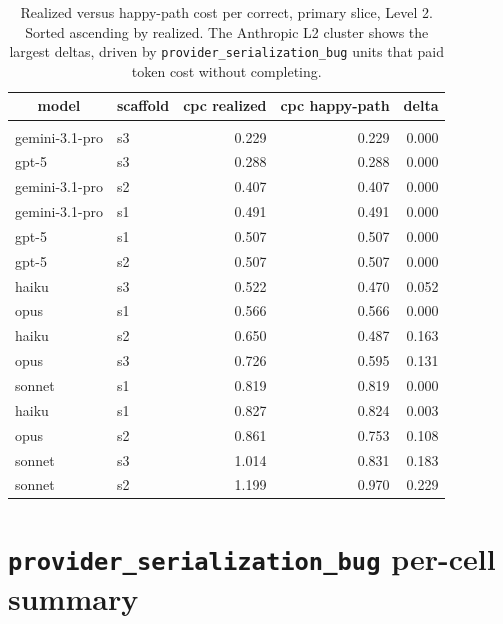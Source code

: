 \documentclass[10pt]{article} %
\begin{document}
    \begin{table}[t]
        \caption{Realized versus happy-path cost per correct, primary slice, Level 2. Sorted ascending by realized. The Anthropic L2 cluster shows the largest deltas, driven by \texttt{provider\_serialization\_bug} units that paid token cost without completing.}
    \label{tab:cpc_happy_L2}
    \begin{center}
    \small
    \begin{tabular}{llrrr}
        \multicolumn{1}{c}{\bf model} & \multicolumn{1}{c}{\bf scaffold} & \multicolumn{1}{c}{\bf cpc realized} & \multicolumn{1}{c}{\bf cpc happy-path} & \multicolumn{1}{c}{\bf delta} \\
        \hline \\
        gemini-3.1-pro & s3 & 0.229 & 0.229 & 0.000 \\
        gpt-5 & s3 & 0.288 & 0.288 & 0.000 \\
        gemini-3.1-pro & s2 & 0.407 & 0.407 & 0.000 \\
        gemini-3.1-pro & s1 & 0.491 & 0.491 & 0.000 \\
        gpt-5 & s1 & 0.507 & 0.507 & 0.000 \\
        gpt-5 & s2 & 0.507 & 0.507 & 0.000 \\
        haiku & s3 & 0.522 & 0.470 & 0.052 \\
        opus & s1 & 0.566 & 0.566 & 0.000 \\
        haiku & s2 & 0.650 & 0.487 & 0.163 \\
        opus & s3 & 0.726 & 0.595 & 0.131 \\
        sonnet & s1 & 0.819 & 0.819 & 0.000 \\
        haiku & s1 & 0.827 & 0.824 & 0.003 \\
        opus & s2 & 0.861 & 0.753 & 0.108 \\
        sonnet & s3 & 1.014 & 0.831 & 0.183 \\
        sonnet & s2 & 1.199 & 0.970 & 0.229 \\
    \end{tabular}
    \end{center}
    \end{table}

\FloatBarrier


\section{\texttt{provider\_serialization\_bug} per-cell summary}
\label{app:provider_bug_summary}
\end{document}
